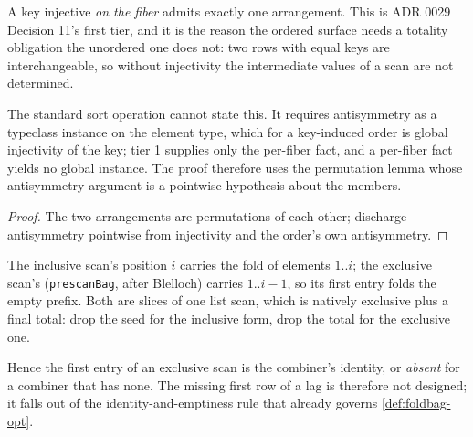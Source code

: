 \begin{theorem}
  \label{thm:arrange-unique}\leanok
  A key injective \emph{on the fiber} admits exactly one arrangement.  This
  is ADR 0029 Decision 11's first tier, and it is the reason the ordered
  surface needs a totality obligation the unordered one does not: two rows
  with equal keys are interchangeable, so without injectivity the
  intermediate values of a scan are not determined.

  The standard sort operation cannot state this.  It requires antisymmetry
  as a typeclass instance on the element type, which for a key-induced
  order is global injectivity of the key; tier 1 supplies only the
  per-fiber fact, and a per-fiber fact yields no global instance.  The
  proof therefore uses the permutation lemma whose antisymmetry argument is
  a pointwise hypothesis about the members.
\end{theorem}
\begin{proof}\leanok
  The two arrangements are permutations of each other; discharge
  antisymmetry pointwise from injectivity and the order's own antisymmetry.
\end{proof}

\begin{definition}
  \label{def:scanbag}\leanok
  The inclusive scan's position $i$ carries the fold of elements $1..i$;
  the exclusive scan's (\texttt{prescanBag}, after Blelloch) carries
  $1..i-1$, so its first entry folds the empty prefix.  Both are slices of
  one list scan, which is natively exclusive plus a final total: drop the
  seed for the inclusive form, drop the total for the exclusive one.

  Hence the first entry of an exclusive scan is the combiner's identity, or
  \emph{absent} for a combiner that has none.  The missing first row of a
  lag is therefore not designed; it falls out of the identity-and-emptiness
  rule that already governs \ref{def:foldbag-opt}.
\end{definition}

